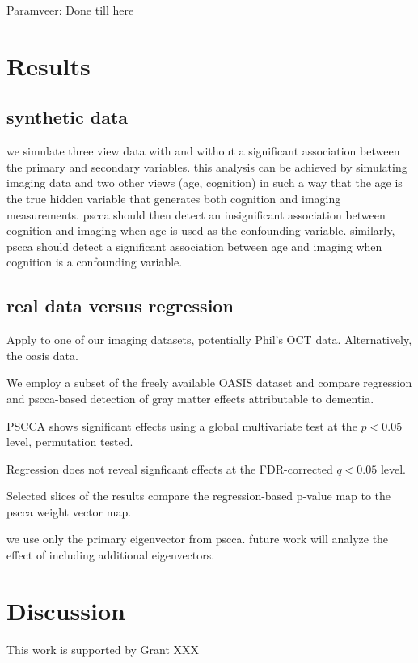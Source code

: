 \documentclass{llncs}
\begin{document}
Paramveer: Done till here
\section{Results}
\subsection{synthetic data}
we simulate three view data with and without a significant association
between the primary and secondary variables.  this analysis can be
achieved by simulating imaging data and two other views (age,
cognition) in such a way that the age is the true hidden variable that
generates both cognition and imaging measurements.  pscca should then
detect an insignificant association between cognition and imaging when
age is used as the confounding variable.  similarly, pscca should
detect a significant association between age and imaging when
cognition is a confounding variable.   

\subsection{real data versus regression}
Apply to one of our imaging datasets, potentially Phil's OCT data.
Alternatively, the oasis data. 

We employ a subset of the freely available OASIS dataset and compare
regression and pscca-based detection of gray matter effects
attributable to dementia.

PSCCA shows significant effects using a global multivariate test at
the $p<0.05$ level, permutation tested.  

Regression does not reveal signficant effects at the FDR-corrected
$q<0.05$ level.  

Selected slices of the results compare the regression-based p-value
map to the pscca weight vector map.  

we use only the primary eigenvector from pscca.  future work will
analyze the effect of including additional eigenvectors. 

\section{Discussion}

 This work is supported by Grant XXX 


\end{document}
